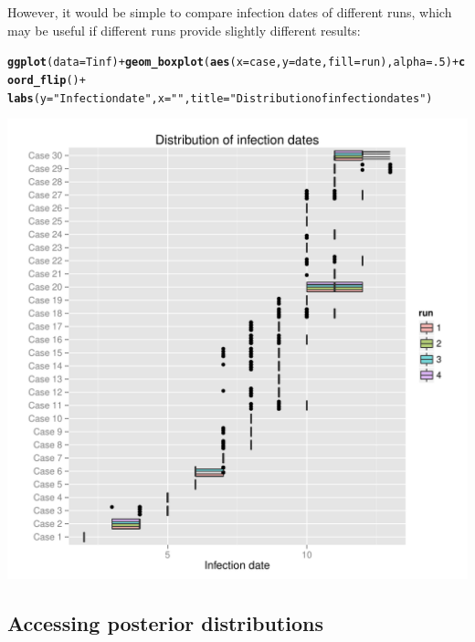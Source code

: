 \documentclass{article}\usepackage[]{graphicx}\usepackage[]{color}
\makeatletter
\newcommand{\hlnum}[1]{\textcolor[rgb]{0.686,0.059,0.569}{#1}}%
\newcommand{\hlstr}[1]{\textcolor[rgb]{0.192,0.494,0.8}{#1}}%
\newcommand{\hlopt}[1]{\textcolor[rgb]{0,0,0}{#1}}%
\newcommand{\hlstd}[1]{\textcolor[rgb]{0.345,0.345,0.345}{#1}}%
\newcommand{\hlkwc}[1]{\textcolor[rgb]{0.333,0.667,0.333}{#1}}%
\newcommand{\hlkwd}[1]{\textcolor[rgb]{0.737,0.353,0.396}{\textbf{#1}}}%
\newenvironment{kframe}{%
 \def\at@end@of@kframe{}%
 \ifinner\ifhmode%
  \def\at@end@of@kframe{\end{minipage}}%
  \begin{minipage}{\columnwidth}%
 \fi\fi%
 \def\FrameCommand##1{\hskip\@totalleftmargin \hskip-\fboxsep
 \colorbox{shadecolor}{##1}\hskip-\fboxsep
     \hskip-\linewidth \hskip-\@totalleftmargin \hskip\columnwidth}%
 \MakeFramed {\advance\hsize-\width
   \@totalleftmargin\z@ \linewidth\hsize
   \@setminipage}}%
 {\par\unskip\endMakeFramed%
 \at@end@of@kframe}
\newenvironment{knitrout}{}{} %
\makeatother
\begin{document}
However, it would be simple to compare infection dates of different runs, which may be useful if
different runs provide slightly different results:
\begin{knitrout}
\color{fgcolor}\begin{kframe}
\begin{alltt}
\hlkwd{ggplot}\hlstd{(}\hlkwc{data}\hlstd{=Tinf)} \hlopt{+} \hlkwd{geom_boxplot}\hlstd{(}\hlkwd{aes}\hlstd{(}\hlkwc{x}\hlstd{=case,}\hlkwc{y}\hlstd{=date,}\hlkwc{fill}\hlstd{=run),}\hlkwc{alpha}\hlstd{=}\hlnum{.5}\hlstd{)} \hlopt{+} \hlkwd{coord_flip}\hlstd{()} \hlopt{+}
    \hlkwd{labs}\hlstd{(}\hlkwc{y}\hlstd{=}\hlstr{"Infection date"}\hlstd{,} \hlkwc{x}\hlstd{=}\hlstr{""}\hlstd{,} \hlkwc{title}\hlstd{=}\hlstr{"Distribution of infection dates"}\hlstd{)}
\end{alltt}
\end{kframe}

{\centering \includegraphics[width=.6\textwidth]{figs/unnamed-chunk-33} 

}



\end{knitrout}





\subsection{Accessing posterior distributions}
\end{document}
